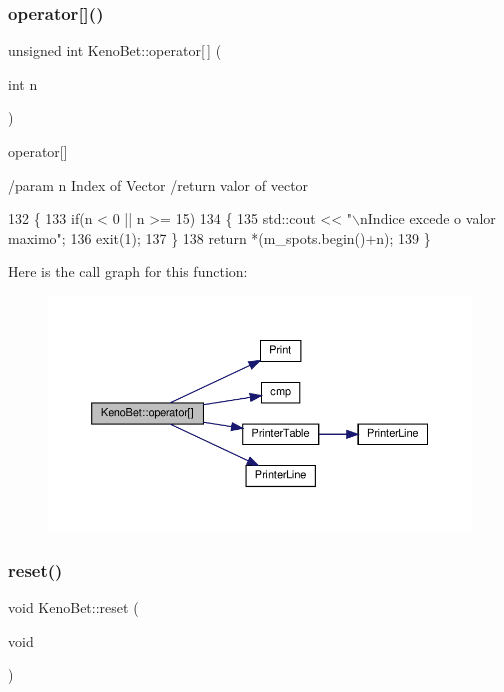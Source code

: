 \subsubsection{\texorpdfstring{operator[]()}{operator[]()}}
{\footnotesize\ttfamily unsigned int Keno\+Bet\+::operator\mbox{[}$\,$\mbox{]} (\begin{DoxyParamCaption}\item[{int}]{n }\end{DoxyParamCaption})\hspace{0.3cm}{\ttfamily [inline]}}



operator\mbox{[}\mbox{]} 

/param n Index of Vector /return valor of vector 
\begin{DoxyCode}
132         \{
133             \textcolor{keywordflow}{if}(n < 0 || n >= 15)
134             \{
135                 std::cout << \textcolor{stringliteral}{"\(\backslash\)nIndice excede o valor maximo"};
136                 exit(1);
137             \}
138             \textcolor{keywordflow}{return} *(m\_spots.begin()+n);
139         \}
\end{DoxyCode}
Here is the call graph for this function\+:
\nopagebreak
\begin{figure}[H]
\begin{center}
\leavevmode
\includegraphics[width=350pt]{classKenoBet_a5a544a0c1ba5872076e7bfdf8f935368_cgraph}
\end{center}
\end{figure}
\mbox{\label{classKenoBet_acc2afd4d502e44fdfbb122f3389bc633}} 
\subsubsection{\texorpdfstring{reset()}{reset()}}
{\footnotesize\ttfamily void Keno\+Bet\+::reset (\begin{DoxyParamCaption}\item[{void}]{ }\end{DoxyParamCaption})}



